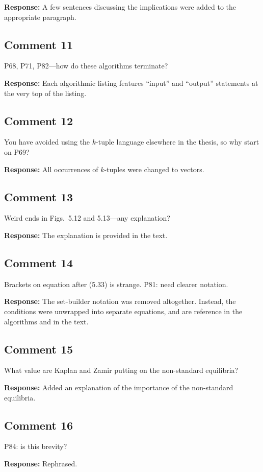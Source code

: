 \documentclass[10pt,a4paper,notitlepage]{article}
\numberwithin{equation}{section}
\begin{document}
\textbf{Response:}
A few sentences discussing the implications were added to the appropriate paragraph.

\subsection{Comment 11}
P68, P71, P82---how do these algorithms terminate?

\textbf{Response:}
Each algorithmic listing features ``input'' and ``output'' statements at the very top of the listing.

\subsection{Comment 12}
You have avoided using the $k$-tuple language elsewhere in the thesis, so why start on P69?

\textbf{Response:}
All occurrences of $k$-tuples were changed to vectors.

\subsection{Comment 13}
Weird ends in Figs.~5.12 and 5.13---any explanation?

\textbf{Response:}
The explanation is provided in the text.

\subsection{Comment 14}
Brackets on equation after (5.33) is strange. P81: need clearer notation.

\textbf{Response:}
The set-builder notation was removed altogether. Instead, the conditions were unwrapped into separate equations, and are reference in the algorithms and in the text.

\subsection{Comment 15}
What value are Kaplan and Zamir putting on the non-standard equilibria?

\textbf{Response:}
Added an explanation of the importance of the non-standard equilibria.

\subsection{Comment 16}
P84: is this brevity?

\textbf{Response:}
Rephrased.
\end{document}
